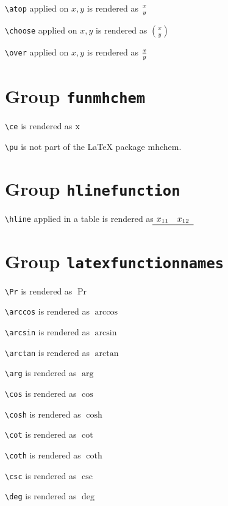 \texttt{\textbackslash atop} applied on $ x, y$ is rendered as $x\atop y$

\texttt{\textbackslash choose} applied on $ x, y$ is rendered as $x\choose y$

\texttt{\textbackslash over} applied on $ x, y$ is rendered as $x\over y$

\section{ Group \texttt{fun\textunderscore mhchem}}

\texttt{\textbackslash ce} is rendered as $\ce{x}$

\texttt{\textbackslash pu} is not part of the \LaTeX{} package mhchem.

\section{ Group \texttt{hline\textunderscore function}}

\texttt{\textbackslash hline} applied in a table is rendered as $\begin{matrix} x_{11} & x_{12} \\ \hline \end{matrix}$

\section{ Group \texttt{latex\textunderscore function\textunderscore names}}

\texttt{\textbackslash Pr} is rendered as $\Pr$

\texttt{\textbackslash arccos} is rendered as $\arccos$

\texttt{\textbackslash arcsin} is rendered as $\arcsin$

\texttt{\textbackslash arctan} is rendered as $\arctan$

\texttt{\textbackslash arg} is rendered as $\arg$

\texttt{\textbackslash cos} is rendered as $\cos$

\texttt{\textbackslash cosh} is rendered as $\cosh$

\texttt{\textbackslash cot} is rendered as $\cot$

\texttt{\textbackslash coth} is rendered as $\coth$

\texttt{\textbackslash csc} is rendered as $\csc$

\texttt{\textbackslash deg} is rendered as $\deg$

